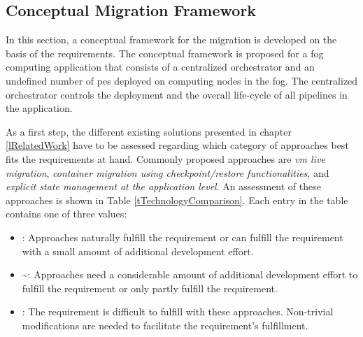 \subsection{Conceptual Migration Framework}
\label{lMigrationConcept}
In this section, a conceptual framework for the migration is developed on the basis of the requirements. The conceptual framework is proposed for a fog computing application that consists of a centralized orchestrator and an undefined number of \gls{pe}s deployed on computing nodes in the fog. The centralized orchestrator controls the deployment and the overall life-cycle of all pipelines in the application.\par %
As a first step, the different existing solutions presented in chapter \ref{lRelatedWork} have to be assessed regarding which category of approaches best fits the requirements at hand. Commonly proposed approaches are \textit{\gls{vm} live migration}, \textit{container migration using checkpoint/restore functionalities}, and \textit{explicit state management at the application level}. An assessment of these approaches is shown in Table \ref{tTechnologyComparison}. Each entry in the table contains one of three values:

\begin{itemize}
    \item \checkmark: Approaches naturally fulfill the requirement or can fulfill the requirement with a small amount of additional development effort.
    \item \textbf{\textasciitilde}: Approaches need a considerable amount of additional development effort to fulfill the requirement or only partly fulfill the requirement.
    \item {}: The requirement is difficult to fulfill with these approaches. Non-trivial modifications are needed to facilitate the requirement's fulfillment.
\end{itemize}


